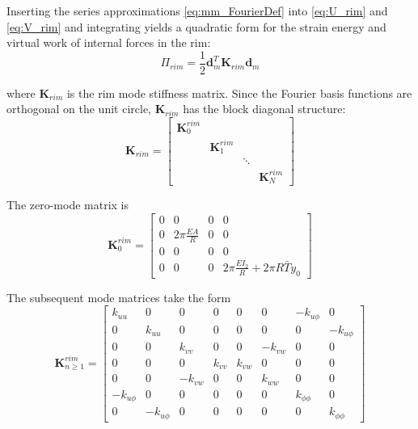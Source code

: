 \documentclass[\rootdir/thesis.tex]{subfiles}
\begin{document}
Inserting the series approximations \eqref{eq:mm_FourierDef} into \eqref{eq:U_rim} and \eqref{eq:V_rim} and integrating yields a quadratic form for the strain energy and virtual work of internal forces in the rim:
\begin{equation}
\label{eq:mm_U_rim}
\Pi_{rim} = \frac{1}{2} \mathbf{d}_m^T \mathbf{K}_{rim} \mathbf{d}_m
\end{equation}

where $\mathbf{K}_{rim}$ is the rim mode stiffness matrix. Since the Fourier basis functions are orthogonal on the unit circle, $\mathbf{K}_{rim}$ has the block diagonal structure:
\begin{equation}
\label{eq:mm_K_rim}
\mathbf{K}_{rim} =
\begin{bmatrix}
\mathbf{K}_0^{rim} & & &\\
& \mathbf{K}_1^{rim} & &\\
& & \ddots &\\
& & & \mathbf{K}_N^{rim}
\end{bmatrix}
\end{equation}

The zero-mode matrix is
\begin{equation}
\mathbf{K}_0^{rim} =
\begin{bmatrix}
0 & 0 & 0 & 0\\
0 & 2\pi \frac{EA}{R} & 0 & 0\\
0 & 0 & 0 & 0\\
0 & 0 & 0 & 2\pi \frac{EI_2}{R} + 2\pi R\bar{T}y_0
\end{bmatrix}
\end{equation}

The subsequent mode matrices take the form
\begin{equation}
\mathbf{K}_{n\geq 1}^{rim} =
\begin{bmatrix}
k_{uu} & 0 & 0 & 0 & 0 & 0 & -k_{u\phi} & 0\\
0 & k_{uu} & 0 & 0 & 0 & 0 & 0 & -k_{u\phi}\\
0 & 0 & k_{vv} & 0 & 0 & -k_{vw} & 0 & 0\\
0 & 0 & 0 & k_{vv} & k_{vw} & 0 & 0 & 0\\
0 & 0 & -k_{vw} & 0 & 0 & k_{ww} & 0 & 0\\
-k_{u\phi} & 0 & 0 & 0 & 0 & 0 & k_{\phi\phi} & 0\\
0 & -k_{u\phi} & 0 & 0 & 0 & 0 & 0 & k_{\phi\phi}
\end{bmatrix}
\end{equation}
\end{document}
